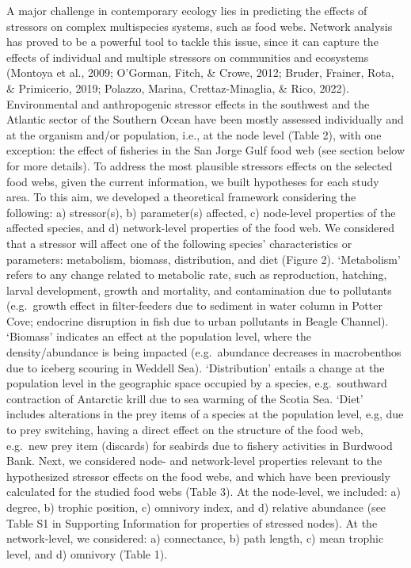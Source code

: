 \documentclass[
]{article}
\begin{document}
A major challenge in contemporary ecology lies in predicting the effects
of stressors on complex multispecies systems, such as food webs. Network
analysis has proved to be a powerful tool to tackle this issue, since it
can capture the effects of individual and multiple stressors on
communities and ecosystems (Montoya et al., 2009; O'Gorman, Fitch, \&
Crowe, 2012; Bruder, Frainer, Rota, \& Primicerio, 2019; Polazzo,
Marina, Crettaz-Minaglia, \& Rico, 2022). Environmental and
anthropogenic stressor effects in the southwest and the Atlantic sector
of the Southern Ocean have been mostly assessed individually and at the
organism and/or population, i.e., at the node level (Table 2), with one
exception: the effect of fisheries in the San Jorge Gulf food web (see
section below for more details). To address the most plausible stressors
effects on the selected food webs, given the current information, we
built hypotheses for each study area. To this aim, we developed a
theoretical framework considering the following: a) stressor(s), b)
parameter(s) affected, c) node-level properties of the affected species,
and d) network-level properties of the food web. We considered that a
stressor will affect one of the following species' characteristics or
parameters: metabolism, biomass, distribution, and diet (Figure 2).
`Metabolism' refers to any change related to metabolic rate, such as
reproduction, hatching, larval development, growth and mortality, and
contamination due to pollutants (e.g.~growth effect in filter-feeders
due to sediment in water column in Potter Cove; endocrine disruption in
fish due to urban pollutants in Beagle Channel). `Biomass' indicates an
effect at the population level, where the density/abundance is being
impacted (e.g.~abundance decreases in macrobenthos due to iceberg
scouring in Weddell Sea). `Distribution' entails a change at the
population level in the geographic space occupied by a species,
e.g.~southward contraction of Antarctic krill due to sea warming of the
Scotia Sea. `Diet' includes alterations in the prey items of a species
at the population level, e.g, due to prey switching, having a direct
effect on the structure of the food web, e.g.~new prey item (discards)
for seabirds due to fishery activities in Burdwood Bank. Next, we
considered node- and network-level properties relevant to the
hypothesized stressor effects on the food webs, and which have been
previously calculated for the studied food webs (Table 3). At the
node-level, we included: a) degree, b) trophic position, c) omnivory
index, and d) relative abundance (see Table S1 in Supporting Information
for properties of stressed nodes). At the network-level, we considered:
a) connectance, b) path length, c) mean trophic level, and d) omnivory
(Table 1).
\end{document}
